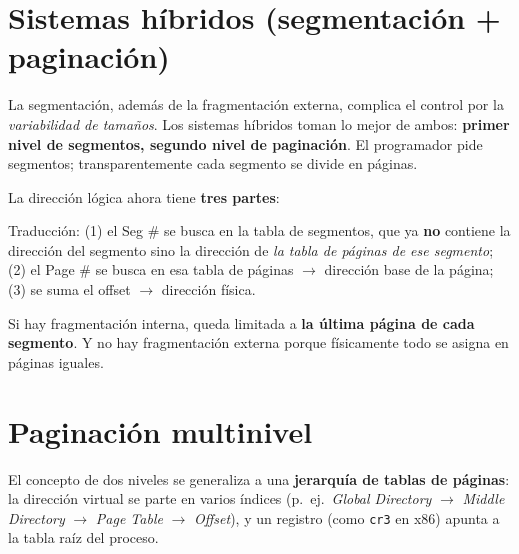 \documentclass[11pt,letterpaper]{article}
\begin{document}
\section{Sistemas h\'ibridos (segmentaci\'on + paginaci\'on)}

La segmentaci\'on, adem\'as de la fragmentaci\'on externa, complica el control por la \emph{variabilidad de tama\~nos}. Los sistemas h\'ibridos toman lo mejor de ambos: \textbf{primer nivel de segmentos, segundo nivel de paginaci\'on}. El programador pide segmentos; transparentemente cada segmento se divide en p\'aginas.

La direcci\'on l\'ogica ahora tiene \textbf{tres partes}:
\begin{center}
\end{center}

Traducci\'on: (1) el Seg \# se busca en la tabla de segmentos, que ya \textbf{no} contiene la direcci\'on del segmento sino la direcci\'on de \emph{la tabla de p\'aginas de ese segmento}; (2) el Page \# se busca en esa tabla de p\'aginas $\rightarrow$ direcci\'on base de la p\'agina; (3) se suma el offset $\rightarrow$ direcci\'on f\'isica.

\begin{idea}
Si hay fragmentaci\'on interna, queda limitada a \textbf{la \'ultima p\'agina de cada segmento}. Y no hay fragmentaci\'on externa porque f\'isicamente todo se asigna en p\'aginas iguales.
\end{idea}

\section{Paginaci\'on multinivel}

El concepto de dos niveles se generaliza a una \textbf{jerarqu\'ia de tablas de p\'aginas}: la direcci\'on virtual se parte en varios \'indices (p.\ ej.\ \emph{Global Directory} $\rightarrow$ \emph{Middle Directory} $\rightarrow$ \emph{Page Table} $\rightarrow$ \emph{Offset}), y un registro (como \texttt{cr3} en x86) apunta a la tabla ra\'iz del proceso.
\end{document}
